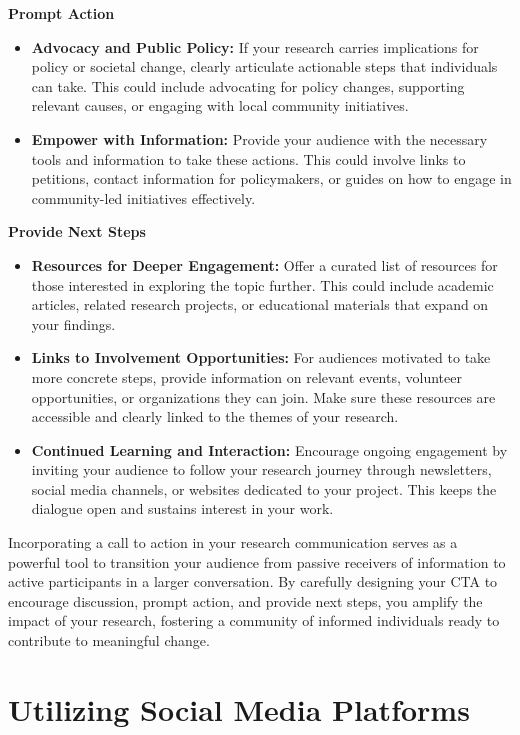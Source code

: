 \documentclass[
]{book}
\begin{document}
\textbf{Prompt Action}

\begin{itemize}
\item
  \textbf{Advocacy and Public Policy:} If your research carries implications for policy or societal change, clearly articulate actionable steps that individuals can take. This could include advocating for policy changes, supporting relevant causes, or engaging with local community initiatives.
\item
  \textbf{Empower with Information:} Provide your audience with the necessary tools and information to take these actions. This could involve links to petitions, contact information for policymakers, or guides on how to engage in community-led initiatives effectively.
\end{itemize}

\textbf{Provide Next Steps}

\begin{itemize}
\item
  \textbf{Resources for Deeper Engagement:} Offer a curated list of resources for those interested in exploring the topic further. This could include academic articles, related research projects, or educational materials that expand on your findings.
\item
  \textbf{Links to Involvement Opportunities:} For audiences motivated to take more concrete steps, provide information on relevant events, volunteer opportunities, or organizations they can join. Make sure these resources are accessible and clearly linked to the themes of your research.
\item
  \textbf{Continued Learning and Interaction:} Encourage ongoing engagement by inviting your audience to follow your research journey through newsletters, social media channels, or websites dedicated to your project. This keeps the dialogue open and sustains interest in your work.
\end{itemize}

Incorporating a call to action in your research communication serves as a powerful tool to transition your audience from passive receivers of information to active participants in a larger conversation. By carefully designing your CTA to encourage discussion, prompt action, and provide next steps, you amplify the impact of your research, fostering a community of informed individuals ready to contribute to meaningful change.

\hypertarget{utilizing-social-media-platforms}{%
\section{Utilizing Social Media Platforms}\label{utilizing-social-media-platforms}}
\end{document}
